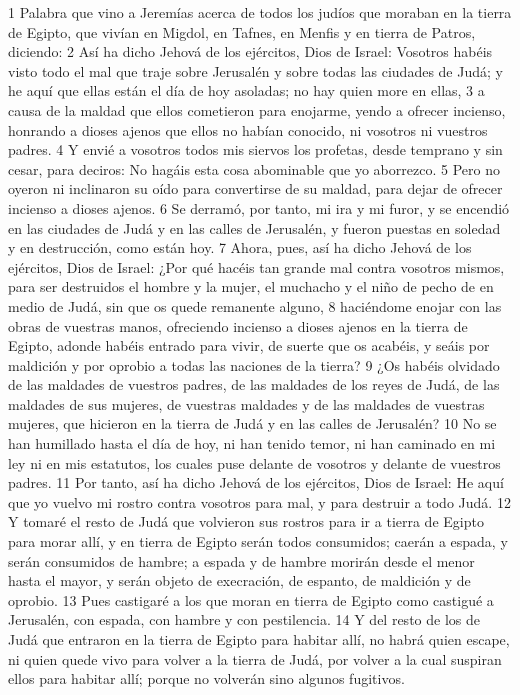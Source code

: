 1 Palabra que vino a Jeremías acerca de todos los judíos que moraban en la tierra de Egipto, que vivían en Migdol, en Tafnes, en Menfis y en tierra de Patros, diciendo:
2 Así ha dicho Jehová de los ejércitos, Dios de Israel: Vosotros habéis visto todo el mal que traje sobre Jerusalén y sobre todas las ciudades de Judá; y he aquí que ellas están el día de hoy asoladas; no hay quien more en ellas,
3 a causa de la maldad que ellos cometieron para enojarme, yendo a ofrecer incienso, honrando a dioses ajenos que ellos no habían conocido, ni vosotros ni vuestros padres.
4 Y envié a vosotros todos mis siervos los profetas, desde temprano y sin cesar, para deciros: No hagáis esta cosa abominable que yo aborrezco.
5 Pero no oyeron ni inclinaron su oído para convertirse de su maldad, para dejar de ofrecer incienso a dioses ajenos.
6 Se derramó, por tanto, mi ira y mi furor, y se encendió en las ciudades de Judá y en las calles de Jerusalén, y fueron puestas en soledad y en destrucción, como están hoy.
7 Ahora, pues, así ha dicho Jehová de los ejércitos, Dios de Israel: ¿Por qué hacéis tan grande mal contra vosotros mismos, para ser destruidos el hombre y la mujer, el muchacho y el niño de pecho de en medio de Judá, sin que os quede remanente alguno,
8 haciéndome enojar con las obras de vuestras manos, ofreciendo incienso a dioses ajenos en la tierra de Egipto, adonde habéis entrado para vivir, de suerte que os acabéis, y seáis por maldición y por oprobio a todas las naciones de la tierra?
9 ¿Os habéis olvidado de las maldades de vuestros padres, de las maldades de los reyes de Judá, de las maldades de sus mujeres, de vuestras maldades y de las maldades de vuestras mujeres, que hicieron en la tierra de Judá y en las calles de Jerusalén?
10 No se han humillado hasta el día de hoy, ni han tenido temor, ni han caminado en mi ley ni en mis estatutos, los cuales puse delante de vosotros y delante de vuestros padres.
11 Por tanto, así ha dicho Jehová de los ejércitos, Dios de Israel: He aquí que yo vuelvo mi rostro contra vosotros para mal, y para destruir a todo Judá.
12 Y tomaré el resto de Judá que volvieron sus rostros para ir a tierra de Egipto para morar allí, y en tierra de Egipto serán todos consumidos; caerán a espada, y serán consumidos de hambre; a espada y de hambre morirán desde el menor hasta el mayor, y serán objeto de execración, de espanto, de maldición y de oprobio.
13 Pues castigaré a los que moran en tierra de Egipto como castigué a Jerusalén, con espada, con hambre y con pestilencia.
14 Y del resto de los de Judá que entraron en la tierra de Egipto para habitar allí, no habrá quien escape, ni quien quede vivo para volver a la tierra de Judá, por volver a la cual suspiran ellos para habitar allí; porque no volverán sino algunos fugitivos.
